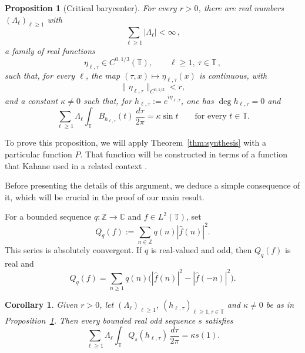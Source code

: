 \documentclass[11pt]{amsart}
\newtheorem{proposition}[theorem]{Proposition}
\newtheorem{corollary}[theorem]{Corollary}
\theoremstyle{definition}
\theoremstyle{remark}
\newcommand{\T}{\mathbb T}
\newcommand{\Z}{\mathbb Z}
\newcommand{\C}{\mathbb C}
\newcommand{\wh}{\widehat}
\DeclareMathOperator{\degmap}{deg}
\begin{document}
\begin{proposition}[Critical barycenter]\label{prop:critical-barycenter}
For every $r>0$, there are real numbers $(\Lambda_\ell)_{\ell\geq1}$ with
\begin{equation}\label{eq:Lambda-l1}
 \sum_{\ell\geq1}|\Lambda_\ell|<\infty \,,
\end{equation}
a family of real functions
\[
 \eta_{\ell,\tau}\in C^{0,1/3}(\T),
 \qquad \ell\geq1,\ \tau\in\T \,,
\]
such that, for every $\ell$, the map $(\tau,x)\mapsto\eta_{\ell,\tau}(x)$ is continuous, with
\begin{equation}\label{eq:small-barycenter-phases}
 \|\eta_{\ell,\tau}\|_{C^{0,1/3}}<r,
\end{equation}
and a constant $\kappa\ne0$ such that, for $h_{\ell,\tau}:=e^{i\eta_{\ell,\tau}}$, one has $\degmap h_{\ell,\tau}=0$ and
\begin{equation}\label{eq:critical-barycenter}
 \sum_{\ell\geq1}\Lambda_\ell
 \int_\T B_{h_{\ell,\tau}}(t)\,\frac{d\tau}{2\pi}
 =\kappa\sin t
 \qquad\text{for every }t\in\T.
\end{equation}
\end{proposition}

To prove this proposition, we will apply Theorem~\ref{thm:synthesis} with a particular function $P$. That function will be constructed in terms of a function that Kahane used in a related context \cite{Kahane2005}.

Before presenting the details of this argument, we deduce a simple consequence of it, which will be crucial in the proof of our main result.

For a bounded sequence $q:\Z\to\C$ and $f\in L^2(\T)$, set
\begin{equation}\label{eq:Qq}
 Q_q(f):=\sum_{n\in\Z}q(n)|\wh f(n)|^2.
\end{equation}
This series is absolutely convergent. If $q$ is real-valued and odd, then
$Q_q(f)$ is real and
\begin{equation}\label{eq:Qq-odd}
 Q_q(f)
 =\sum_{n\geq1}q(n)
 \big(|\wh f(n)|^2-|\wh f(-n)|^2\big).
\end{equation}

\begin{corollary}\label{cor:barycenter-multiplier}
Given $r>0$, let $(\Lambda_\ell)_{\ell\geq1}$, $(h_{\ell,\tau})_{\ell\geq 1, \tau\in\T}$ and $\kappa\neq 0$ be as in Proposition~\ref{prop:critical-barycenter}. Then every bounded real odd sequence $s$ satisfies
\begin{equation}\label{eq:barycenter-Q}
 \sum_{\ell\geq1}\Lambda_\ell
 \int_\T Q_s(h_{\ell,\tau})\,\frac{d\tau}{2\pi}
 =\kappa s(1).
\end{equation}
\end{corollary}
\end{document}
